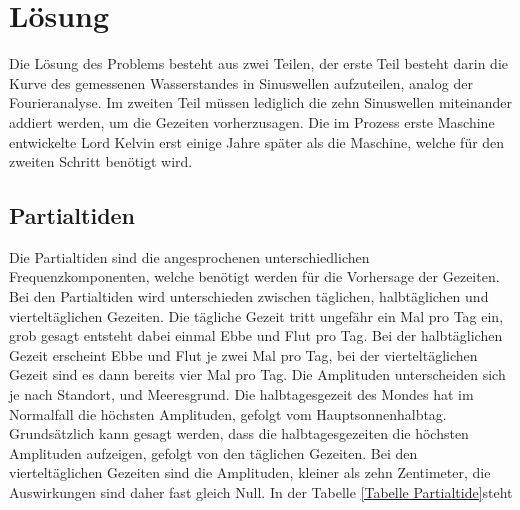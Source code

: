 %
%
%
%
\section{Lösung
	\label{gezeiten:section:Lösung}}
Die Lösung des Problems besteht aus zwei Teilen, der erste Teil besteht darin die Kurve des gemessenen Wasserstandes in Sinuswellen aufzuteilen, analog der Fourieranalyse.
Im zweiten Teil müssen lediglich die zehn Sinuswellen miteinander addiert werden, um die Gezeiten vorherzusagen.
Die im Prozess erste Maschine entwickelte Lord Kelvin erst einige Jahre später als die Maschine, welche für den zweiten Schritt benötigt wird.

\subsection{Partialtiden}
Die Partialtiden sind die angesprochenen unterschiedlichen Frequenzkomponenten, welche benötigt werden für die Vorhersage der Gezeiten.
Bei den Partialtiden wird unterschieden zwischen täglichen, halbtäglichen und vierteltäglichen Gezeiten.
Die tägliche Gezeit tritt ungefähr ein Mal pro Tag ein, grob gesagt entsteht dabei einmal Ebbe und Flut pro Tag.
Bei der halbtäglichen Gezeit erscheint Ebbe und Flut je zwei Mal pro Tag, bei der vierteltäglichen Gezeit sind es dann bereits vier Mal pro Tag.
Die Amplituden unterscheiden sich je nach Standort, und Meeresgrund.
Die halbtagesgezeit des Mondes hat im Normalfall die höchsten Amplituden, gefolgt vom Hauptsonnenhalbtag.
Grundsätzlich kann gesagt werden, dass die halbtagesgezeiten die höchsten Amplituden aufzeigen, gefolgt von den täglichen Gezeiten.
Bei den vierteltäglichen Gezeiten sind die Amplituden, kleiner als zehn Zentimeter, die Auswirkungen sind daher fast gleich Null.
In der Tabelle \ref{Tabelle Partialtide}steht 

